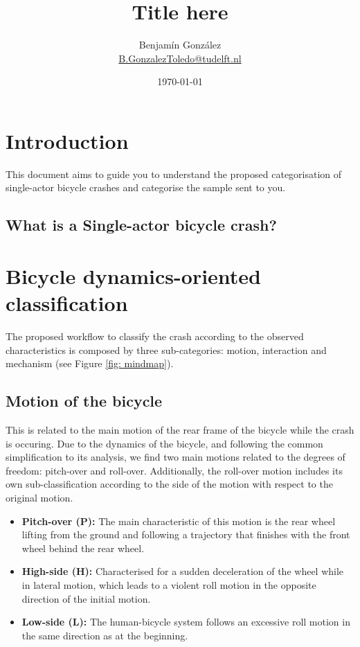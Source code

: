 \documentclass{article}
\title{Title here}
\author{
  Benjam\'in Gonz\'alez\\
  \small{\href{mailto:b.gonzaleztoledo@tudelft.nl}{B.GonzalezToledo@tudelft.nl}}
  }
\date{\today}
\begin{document}
\maketitle

\section{Introduction}

This document aims to guide you to understand the proposed categorisation of single-actor bicycle crashes and categorise the sample sent to you.

\subsection{What is a Single-actor bicycle crash?}

\section{Bicycle dynamics-oriented classification}

The proposed workflow to classify the crash according to the observed characteristics is composed by three sub-categories: motion, interaction and mechanism (see Figure \ref{fig: mindmap}).

\subsection{Motion of the bicycle}

This is related to the main motion of the rear frame of the bicycle while the crash is occuring.
%
Due to the dynamics of the bicycle, and following the common simplification to its analysis, we find two main motions related to the degrees of freedom: pitch-over and roll-over.
%
Additionally, the roll-over motion includes its own sub-classification according to the side of the motion with respect to the original motion.

\begin{itemize}
    \item \textbf{Pitch-over (P):} The main characteristic of this motion is the rear wheel lifting from the ground and following a trajectory that finishes with the front wheel behind the rear wheel.
    \item \textbf{High-side (H):} Characterised for a sudden deceleration of the wheel while in lateral motion, which leads to a violent roll motion in the opposite direction of the initial motion.
    \item \textbf{Low-side (L):} The human-bicycle system follows an excessive roll motion in the same direction as at the beginning.
\end{itemize}
\end{document}
